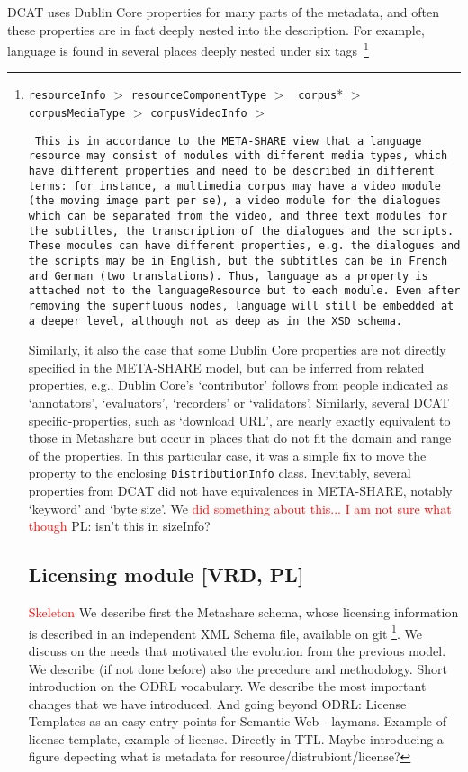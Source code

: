 \documentclass{llncs}
\begin{document}
DCAT uses Dublin Core properties for many parts of the metadata, and often these
properties are in fact deeply nested into the description. For example, language
is found in several places deeply nested under six
tags~\footnote{{\tt resourceInfo} $>$ {\tt resourceComponentType} $>$ {\tt
corpus}* $>$ {\tt corpusMediaType} $>$ {\tt corpusVideoInfo} $>$ {\tt
This is in accordance to the META-SHARE view that a language resource may consist of modules with different media types, which have different properties and need to be described in different terms: for instance, a multimedia corpus may have a video module (the moving image part per se), a video module for the dialogues which can be separated from the video, and three text modules for the subtitles, the transcription of the dialogues and the scripts. These modules can have different properties, e.g. the dialogues and the scripts may be in English, but the subtitles can be in French and German (two translations). Thus, language as a property is attached not to the languageResource but to each module. Even after removing the superfluous nodes, language will still be embedded at a deeper level, although not as deep as in the XSD schema.


Similarly, it also the case that some Dublin Core properties are not directly
specified in the META-SHARE model, but can be inferred from related properties,
e.g., Dublin Core's `contributor' follows from people indicated as `annotators',
`evaluators', `recorders' or `validators'. Similarly, several DCAT specific-properties, such as `download URL', are nearly
exactly equivalent to those in Metashare but occur in places that do not fit the
domain and range of the properties. In this particular case, it was a simple fix
to move the property to the enclosing {\tt DistributionInfo} class.
Inevitably, several properties from DCAT did not have equivalences in
META-SHARE, notably `keyword' and `byte size'. We \textcolor{red}{did something
about this... I am not sure what though}
{PL: isn't this in sizeInfo?}

\subsection{Licensing module [VRD, PL]}
\label{sec:licensing}
\textcolor{red}{Skeleton}
We describe first the Metashare schema, whose licensing information is described in an independent XML Schema file, available on git \footnote{\url{https://github.com/metashare/META-SHARE/blob/master/misc/schema/v3.0/META-SHARE-LicenseMetadata.xsd}}.
We discuss on the needs that motivated the evolution from the previous model. We describe (if not done before) also the precedure and methodology.
Short introduction on the ODRL vocabulary.
We describe the most important changes that we have introduced.
And going beyond ODRL: License Templates as an easy entry points for Semantic Web - laymans.
Example of license template, example of license. Directly in TTL. Maybe introducing a figure depecting what is metadata for resource/distrubiont/license?
}}
\end{document}
